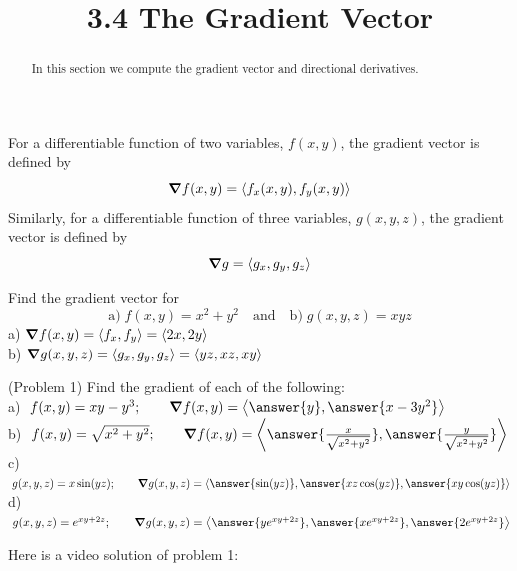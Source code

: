 \documentclass[handout]{ximera}
\title{3.4 The Gradient Vector}
\begin{document}
\begin{abstract}
In this section we compute the gradient vector and directional derivatives.
\end{abstract}

\maketitle

\begin{definition}
For a differentiable function of two variables, $f(x,y)$, the gradient vector is defined by
\[
\boldsymbol\nabla f(x,y) = \left\langle f_x(x,y), f_y(x,y)\right\rangle 
\]
Similarly, for a differentiable function of three variables, $g(x,y, z)$, the gradient 
vector is defined by
\[
\boldsymbol\nabla g = \left\langle g_x, g_y, g_z\right\rangle
\]
\end{definition}

\begin{example}[Example 1]
Find the gradient vector for 
\[
\text{a)} \;f(x,y) = x^2 + y^2\quad \text{and} \quad  \text{b)} \;g(x, y, z) = xyz
\]
a) $\boldsymbol\nabla f(x,y) = \left\langle f_x, f_y\right\rangle = \left\langle 2x, 2y\right\rangle$ \\
b) $\boldsymbol\nabla g(x,y, z) = \left\langle g_x, g_y, g_z\right\rangle= \left\langle yz, xz, xy\right\rangle$
\end{example}


\begin{problem}(Problem 1)
Find the gradient of each of the following:\\
a) $\;f(x,y) = xy - y^3; \quad \quad \grad f(x,y) = 
\vector{\answer{y}, \answer{x - 3y^2}}$\\
b) $\;f(x,y) = \sqrt{x^2 + y^2}; \quad \quad  \grad f(x,y) = 
\vector{\answer{\frac{x}{\sqrt{x^2 + y^2}}}, \answer{\frac{y}{\sqrt{x^2 + y^2}}}}$\\
c) $\;g(x,y, z) = x\sin(yz); \\\quad \quad \grad g(x,y, z) = 
\vector{\answer{\sin(yz)}, \answer{xz\cos(yz)} , \answer{xy\cos(yz)} }$\\
d) $\;g(x,y, z) = e^{xy+2z}; \\\quad \quad \grad g(x,y, z) = 
\vector{\answer{ye^{xy+2z}}, \answer{xe^{xy+2z}} , \answer{2e^{xy+2 z}} }$\\
\end{problem}

Here is a video solution of problem 1:\\
\begin{foldable}
\end{foldable}
\end{document}
